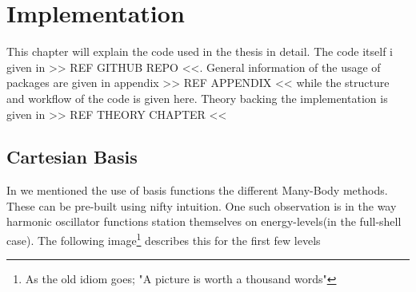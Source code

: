 \chapter{Implementation \label{chapter:6}}
    This chapter will explain the code used in the thesis in detail. The code
    itself i given in >> REF GITHUB REPO <<. General information of the usage
    of packages are given in appendix >> REF APPENDIX << while the structure
    and workflow of the code is given here. Theory backing the implementation
    is given in >> REF THEORY CHAPTER <<

\section{Cartesian Basis}
    In  we mentioned the use of basis functions the different
    Many-Body methods. These can be pre-built using nifty intuition. One such
    observation is in the way harmonic oscillator functions station themselves
    on energy-levels(in the full-shell case). The following image\footnote{As
    the old idiom goes; "A picture is worth a thousand words"} describes this
    for the first few levels

